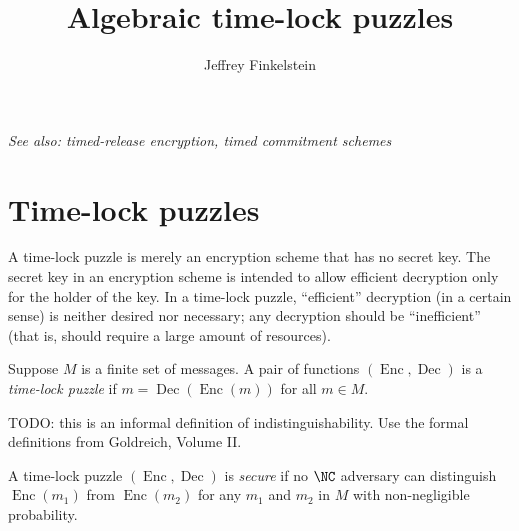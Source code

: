 \documentclass{article}
\title{Algebraic time-lock puzzles}
\author{Jeffrey Finkelstein}
\newcommand{\Enc}{\operatorname{Enc}}
\newcommand{\Dec}{\operatorname{Dec}}
\begin{document}
\maketitle



\emph{See also: timed-release encryption, timed commitment schemes}

\section{Time-lock puzzles}

A time-lock puzzle is merely an encryption scheme that has no secret key.
The secret key in an encryption scheme is intended to allow efficient decryption only for the holder of the key.
In a time-lock puzzle, ``efficient'' decryption (in a certain sense) is neither desired nor necessary; any decryption should be ``inefficient'' (that is, should require a large amount of resources).

\begin{definition}
  Suppose $M$ is a finite set of messages.
  A pair of functions $(\Enc, \Dec)$ is a \emph{time-lock puzzle} if $m = \Dec(\Enc(m))$ for all $m \in M$.
\end{definition}

\begin{definition}
  TODO: this is an informal definition of indistinguishability.
  Use the formal definitions from Goldreich, Volume II.

  A time-lock puzzle $(\Enc, \Dec)$ is \emph{secure} if no $\NC$ adversary can distinguish $\Enc(m_1)$ from $\Enc(m_2)$ for any $m_1$ and $m_2$ in $M$ with non-negligible probability.
\end{definition}
\end{document}
